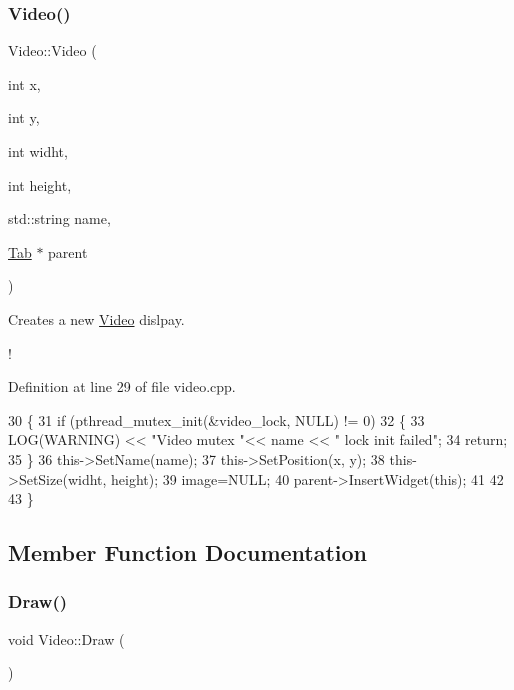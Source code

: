 \subsubsection{\texorpdfstring{Video()}{Video()}}
{\footnotesize\ttfamily Video\+::\+Video (\begin{DoxyParamCaption}\item[{int}]{x,  }\item[{int}]{y,  }\item[{int}]{widht,  }\item[{int}]{height,  }\item[{std\+::string}]{name,  }\item[{\hyperlink{class_tab}{Tab} $\ast$}]{parent }\end{DoxyParamCaption})}



Creates a new \hyperlink{class_video}{Video} dislpay. 

! 

Definition at line 29 of file video.\+cpp.


\begin{DoxyCode}
30 \{
31     \textcolor{keywordflow}{if} (pthread\_mutex\_init(&video\_lock, NULL) != 0)
32     \{
33         LOG(WARNING) << \textcolor{stringliteral}{"Video mutex "}<< name << \textcolor{stringliteral}{" lock init failed"};
34         \textcolor{keywordflow}{return};
35     \}
36     this->SetName(name);
37     this->SetPosition(x, y);
38     this->SetSize(widht, height);
39     image=NULL;
40     parent->InsertWidget(\textcolor{keyword}{this});
41     
42     
43 \}
\end{DoxyCode}


\subsection{Member Function Documentation}
\mbox{\label{class_video_ae6377f888f7d485fddde3df9abaa4eda}} 
\subsubsection{\texorpdfstring{Draw()}{Draw()}}
{\footnotesize\ttfamily void Video\+::\+Draw (\begin{DoxyParamCaption}{ }\end{DoxyParamCaption})\hspace{0.3cm}{\ttfamily [virtual]}}




